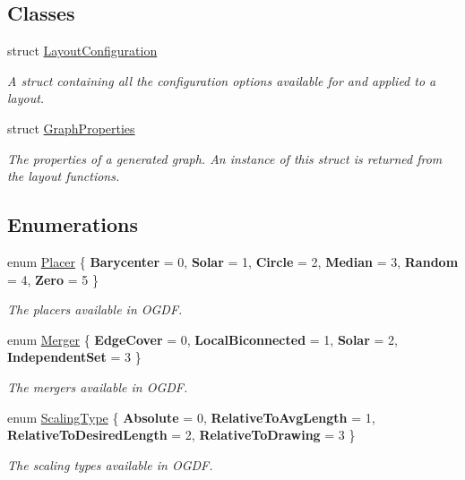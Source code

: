 \subsection*{Classes}
\begin{DoxyCompactItemize}
\item 
struct \hyperlink{structLayoutConfiguration}{Layout\+Configuration}
\begin{DoxyCompactList}\small\item\em A struct containing all the configuration options available for and applied to a layout. \end{DoxyCompactList}\item 
struct \hyperlink{structGraphProperties}{Graph\+Properties}
\begin{DoxyCompactList}\small\item\em The properties of a generated graph. An instance of this struct is returned from the layout functions. \end{DoxyCompactList}\end{DoxyCompactItemize}
\subsection*{Enumerations}
\begin{DoxyCompactItemize}
\item 
\mbox{\label{layout_8hh_a93e50260439be3f5fe75b271c0ce2c96}} 
enum \hyperlink{layout_8hh_a93e50260439be3f5fe75b271c0ce2c96}{Placer} \{ \newline
{\bfseries Barycenter} = 0, 
{\bfseries Solar} = 1, 
{\bfseries Circle} = 2, 
{\bfseries Median} = 3, 
\newline
{\bfseries Random} = 4, 
{\bfseries Zero} = 5
 \}\begin{DoxyCompactList}\small\item\em The placers available in O\+G\+DF. \end{DoxyCompactList}
\item 
\mbox{\label{layout_8hh_a87e3986b1a6733e81a1c0b4bbd6aba18}} 
enum \hyperlink{layout_8hh_a87e3986b1a6733e81a1c0b4bbd6aba18}{Merger} \{ {\bfseries Edge\+Cover} = 0, 
{\bfseries Local\+Biconnected} = 1, 
{\bfseries Solar} = 2, 
{\bfseries Independent\+Set} = 3
 \}\begin{DoxyCompactList}\small\item\em The mergers available in O\+G\+DF. \end{DoxyCompactList}
\item 
\mbox{\label{layout_8hh_ae327227c361ab0e868a1f25017cb3ae2}} 
enum \hyperlink{layout_8hh_ae327227c361ab0e868a1f25017cb3ae2}{Scaling\+Type} \{ {\bfseries Absolute} = 0, 
{\bfseries Relative\+To\+Avg\+Length} = 1, 
{\bfseries Relative\+To\+Desired\+Length} = 2, 
{\bfseries Relative\+To\+Drawing} = 3
 \}\begin{DoxyCompactList}\small\item\em The scaling types available in O\+G\+DF. \end{DoxyCompactList}
\end{DoxyCompactItemize}
